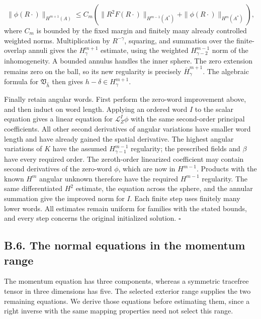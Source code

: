 \documentclass[
  english,
  11pt,
  reqno]{amsart}
\begin{document}
\label{eq:online-extension-scalar-annular-estimate} \[
\|\phi(R\cdot)\|_{H^{m+1}(A)}
\le C_m\left(
\|R^2F(R\cdot)\|_{H^{m-1}(A^*)}
+\|\phi(R\cdot)\|_{H^m(A^*)}\right),
\] where \(C_m\) is bounded by the fixed margin and finitely many
already controlled weighted norms. Multiplication by \(R^{-\gamma}\),
squaring, and summation over the finite-overlap annuli gives the
\(H^{m+1}_\gamma\) estimate, using the weighted \(H^{m-1}_{\gamma-2}\)
norm of the inhomogeneity. A bounded annulus handles the inner sphere.
The zero extension remains zero on the ball, so its new regularity is
precisely \(\overline H^{m+1}_\gamma\). The algebraic formula for
\(\mathfrak V_{\widehat h}\) then gives \(h-\delta\in H^{m+1}_\gamma\).

Finally retain angular words. First perform the zero-word improvement
above, and then induct on word length. Applying an ordered word \(I\) to
the scalar equation gives a linear equation for \(\mathcal L_Z^I\phi\)
with the same second-order principal coefficients. All other second
derivatives of angular variations have smaller word length and have
already gained the spatial derivative. The highest angular variations of
\(K\) have the assumed \(H^{m-1}_{\gamma-1}\) regularity; the prescribed
fields and \(\beta\) have every required order. The zeroth-order
linearized coefficient may contain second derivatives of the zero-word
\(\phi\), which are now in \(H^{m-1}\). Products with the known \(H^m\)
angular unknown therefore have the required \(H^{m-1}\) regularity. The
same differentiated \(H^2\) estimate, the equation across the sphere,
and the annular summation give the improved norm for \(I\). Each finite
step uses finitely many lower words. All estimates remain uniform for
families with the stated bounds, and every step concerns the original
initialized solution. \hfill\(\square\)

\subsection{B.6. The normal equations in the momentum
range}\label{b.6.-the-normal-equations-in-the-momentum-range}\label{sec:online-momentum-range-normal-equations}

The momentum equation has three components, whereas a symmetric
tracefree tensor in three dimensions has five. The selected exterior
range supplies the two remaining equations. We derive those equations
before estimating them, since a right inverse with the same mapping
properties need not select this range.
\end{document}
